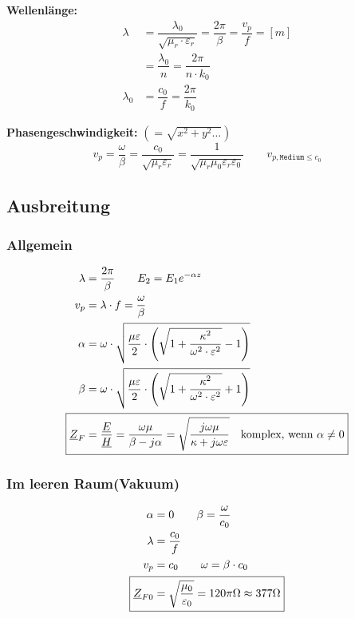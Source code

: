 \textbf{Wellenlänge:}
\begin{align*}
    \lambda   & = \dfrac{\lambda_0}{\sqrt{\mu_r \cdot \varepsilon_r}} = \dfrac{2 \pi}{\beta} = \dfrac{v_p}{f} = [m] \\
              & = \dfrac{\lambda_0}{n} = \dfrac{2 \pi}{n \cdot k_0}                                             \\
    \lambda_0 & = \dfrac{c_0}{f} = \dfrac{2\pi}{k_0}
\end{align*}

\textbf{Phasengeschwindigkeit:}
$\left(= \sqrt{x^2 + y^2 \dots} \right)$
\[
    v_p = \dfrac{\omega}{\beta} = \frac{c_0}{\sqrt{ \mu_r \varepsilon_r }}  = \frac{1}{\sqrt{ \mu_r \mu_0 \varepsilon_r \varepsilon_0}} \qquad v_{p,\texttt{Medium} \leq c_0}
\]


\subsection{Ausbreitung}
\subsubsection{Allgemein}
\begin{align*}
    \lambda                 & = \dfrac{2\pi}{\beta}         \qquad E_2 = E_1 e^{-\alpha z}                                                                                        \\
    v_p                     & = \lambda\cdot f = \dfrac{\omega}{\beta}                                                                                                    \\
    \alpha                  & = \omega \cdot \sqrt{\dfrac{\mu \varepsilon}{2}\cdot \left(\sqrt{1+\dfrac{\kappa^2}{\omega^2\cdot\varepsilon^2}} - 1\right)}   \\
    \beta                   & = \omega \cdot \sqrt{\dfrac{\mu \varepsilon}{2}\cdot \left(\sqrt{1+\dfrac{\kappa^2}{\omega^2\cdot\varepsilon^2}} + 1\right)} \\
    \Aboxed{\underline{Z}_F & = \dfrac{\underline{E}}{\underline{H}} = \dfrac{\omega \mu}{\beta - j \alpha} = \sqrt{\dfrac{j\omega\mu}{\kappa+j\omega\varepsilon}} \quad\text{komplex, wenn } \alpha \neq 0} 
\end{align*}

\subsubsection{Im leeren Raum(Vakuum)}
\begin{align*}
    \alpha                     & = 0  \qquad \beta = \dfrac{\omega}{c_0}                                                  \\
    \lambda                    & = \dfrac{c_0}{f}                                                       \\
    v_p                        & = c_0        \qquad  \omega = \beta \cdot c_0                                \\
    \Aboxed{\underline{Z}_{F0} & = \sqrt{\dfrac{\mu_0}{\varepsilon_0}} = 120 \pi\Omega\approx377\Omega}
\end{align*}

